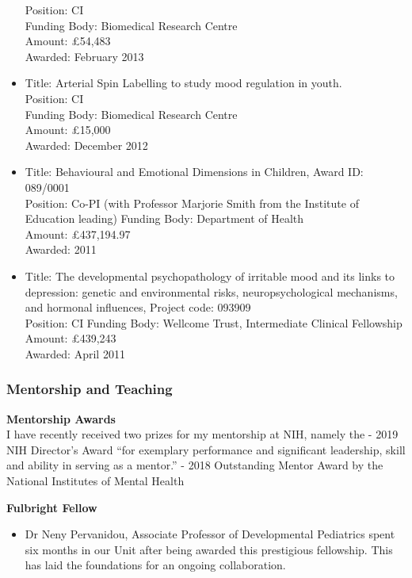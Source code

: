 \documentclass[
]{article}
\providecommand{\tightlist}{%
  \setlength{\itemsep}{0pt}\setlength{\parskip}{0pt}}
\begin{document}
\begin{itemize}
  Position: CI\\
  Funding Body: Biomedical Research Centre\\
  Amount: £54,483\\
  Awarded: February 2013
\item
  Title: Arterial Spin Labelling to study mood regulation in youth.\\
  Position: CI\\
  Funding Body: Biomedical Research Centre\\
  Amount: £15,000\\
  Awarded: December 2012
\item
  Title: Behavioural and Emotional Dimensions in Children, Award ID:
  089/0001\\
  Position: Co-PI (with Professor Marjorie Smith from the Institute of
  Education leading) Funding Body: Department of Health\\
  Amount: £437,194.97\\
  Awarded: 2011
\item
  Title: The developmental psychopathology of irritable mood and its
  links to depression: genetic and environmental risks,
  neuropsychological mechanisms, and hormonal influences, Project code:
  093909\\
  Position: CI Funding Body: Wellcome Trust, Intermediate Clinical
  Fellowship\\
  Amount: £439,243\\
  Awarded: April 2011
\end{itemize}

\hypertarget{mentorship-and-teaching}{%
\subsubsection{Mentorship and Teaching}\label{mentorship-and-teaching}}

\textbf{Mentorship Awards}\\
I have recently received two prizes for my mentorship at NIH, namely the
- 2019 NIH Director's Award ``for exemplary performance and significant
leadership, skill and ability in serving as a mentor.'' - 2018
Outstanding Mentor Award by the National Institutes of Mental Health

\textbf{Fulbright Fellow}

\begin{itemize}
\tightlist
\item
  Dr Neny Pervanidou, Associate Professor of Developmental Pediatrics
  spent six months in our Unit after being awarded this prestigious
  fellowship. This has laid the foundations for an ongoing
  collaboration.
\end{itemize}
\end{document}
